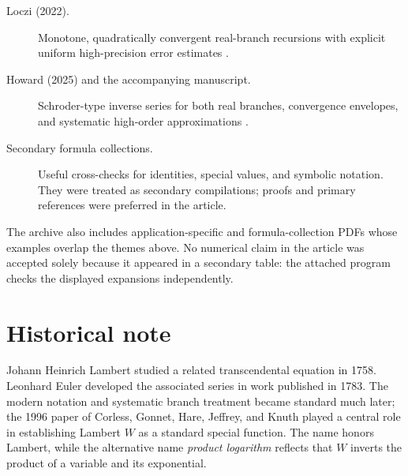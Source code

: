 \documentclass[11pt,oneside]{book}
\theoremstyle{definition}
\theoremstyle{remark}
\begin{document}
\begin{description}
\item[Loczi (2022).]
Monotone, quadratically convergent real-branch recursions with explicit
uniform high-precision error estimates \cite{loczi2022}.

\item[Howard (2025) and the accompanying manuscript.]
Schroder-type inverse series for both real branches, convergence envelopes,
and systematic high-order approximations \cite{howard2025}.

\item[Secondary formula collections.]
Useful cross-checks for identities, special values, and symbolic notation.
They were treated as secondary compilations; proofs and primary references
were preferred in the article.
\end{description}

The archive also includes application-specific and formula-collection PDFs
whose examples overlap the themes above.  No numerical claim in the article
was accepted solely because it appeared in a secondary table: the attached
program checks the displayed expansions independently.


\backmatter

\chapter*{Historical note}
Johann Heinrich Lambert studied a related transcendental equation in 1758.
Leonhard Euler developed the associated series in work published in 1783.
The modern notation and systematic branch treatment became standard much
later; the 1996 paper of Corless, Gonnet, Hare, Jeffrey, and Knuth played a
central role in establishing Lambert $W$ as a standard special function.
The name honors Lambert, while the alternative name \emph{product logarithm}
reflects that $W$ inverts the product of a variable and its exponential.
\end{document}
